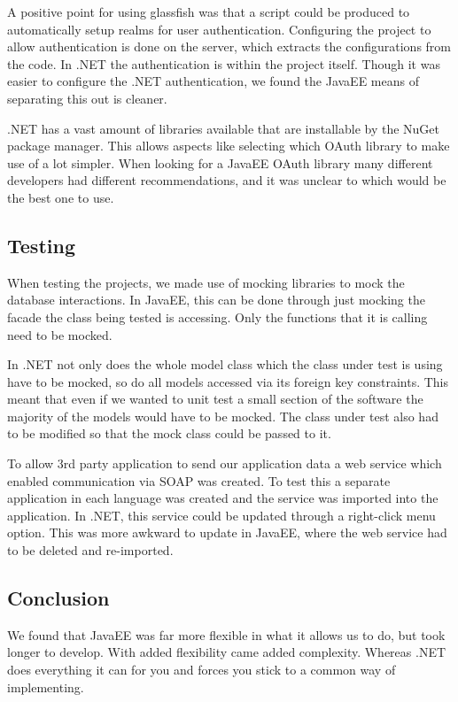 A positive point for using glassfish was that a script could be produced to automatically setup realms for user authentication. Configuring the project to allow authentication is done on the server, which extracts the configurations from the code. In .NET the authentication is within the project itself. Though it was easier to configure the .NET authentication, we found the JavaEE means of separating this out is cleaner.


.NET has a vast amount of libraries available that are installable by the NuGet package manager. This allows aspects like selecting which OAuth library to make use of a lot simpler. When looking for a JavaEE OAuth library many different developers had different recommendations, and it was unclear to which would be the best one to use. 


\subsection{Testing}
When testing the projects, we made use of mocking libraries to mock the database interactions. In JavaEE, this can be done through just mocking the facade the class being tested is accessing. Only the functions that it is calling need to be mocked. 

In .NET not only does the whole model class which the class under test is using have to be mocked, so do all models accessed via its foreign key constraints. This meant that even if we wanted to unit test a small section of the software the majority of the models would have to be mocked. The class under test also had to be modified so that the mock class could be passed to it.

To allow 3rd party application to send our application data a web service which enabled communication via SOAP was created. To test this a separate application in each language was created and the service was imported into the application. In .NET, this service could be updated through a right-click menu option. This was more awkward to update in JavaEE, where the web service had to be deleted and re-imported.

\subsection{Conclusion}

We found that JavaEE was far more flexible in what it allows us to do, but took longer to develop. With added flexibility came added complexity. Whereas .NET does everything it can for you and forces you stick to a common way of implementing. 


